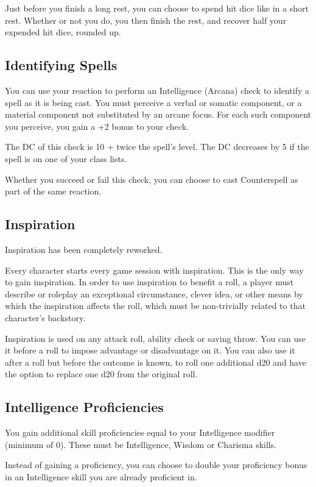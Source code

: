 \documentclass[letterpaper,twocolumn,openany,nodeprecatedcode]{dndbook}
\begin{document}
Just before you finish a long rest, you can choose to spend hit dice like in a short rest. Whether or not you do, you then finish the rest, and recover half your expended hit dice, rounded up.

\subsection{Identifying Spells}
You can use your reaction to perform an Intelligence (Arcana) check to identify a spell as it is being cast. You must perceive a verbal or somatic component, or a material component not substituted by an arcane focus. For each such component you perceive, you gain a +2 bonus to your check.

The DC of this check is 10 + twice the spell's level. The DC decreases by 5 if the spell is on one of your class lists. 

Whether you succeed or fail this check, you can choose to cast Counterspell as part of the same reaction.

\subsection{Inspiration}
Inspiration has been completely reworked.

Every character starts every game session with inspiration. This is the only way to gain inspiration. In order to use inspiration to benefit a roll, a player must describe or roleplay an exceptional circumstance, clever idea, or other means by which the inspiration affects the roll, which must be non-trivially related to that character's backstory.

Inspiration is used on any attack roll, ability check or saving throw. You can use it before a roll to impose advantage or disadvantage on it. You can also use it after a roll but before the outcome is known, to roll one additional d20 and have the option to replace one d20 from the original roll. 

\subsection{Intelligence Proficiencies}
You gain additional skill proficiencies equal to your Intelligence modifier (minimum of 0). These must be Intelligence, Wisdom or Charisma skills. 

Instead of gaining a proficiency, you can choose to double your proficiency bonus in an Intelligence skill you are already proficient in.
\end{document}
